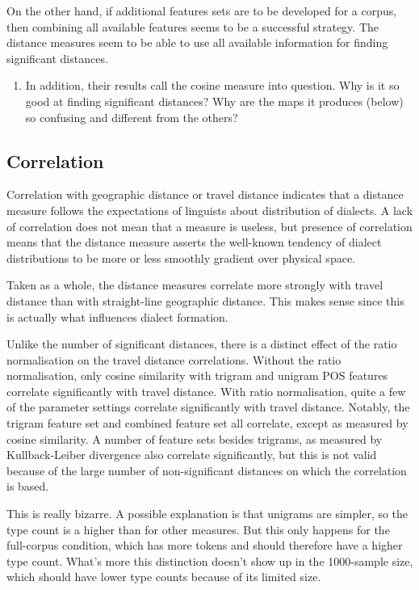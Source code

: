 On the other hand, if additional features sets are to be developed for
a corpus, then combining all available features seems to be a
successful strategy. The distance measures seem to be able to use all
available information for finding significant distances.

\begin{enumerate}
\item In addition, their results call the cosine measure into question. Why is it so
  good at finding significant distances? Why are the maps it produces (below) so
  confusing and different from the others?
\end{enumerate}
\subsection{Correlation}

Correlation with geographic distance or travel distance indicates that
a distance measure follows the expectations of linguists about
distribution of dialects. A lack of correlation does not mean that a
measure is useless, but presence of correlation means that the
distance measure asserts the well-known tendency of dialect
distributions to be more or less smoothly gradient over physical
space.

Taken as a whole, the distance measures correlate more strongly with
travel distance than with straight-line geographic distance. This
makes sense since this is actually what influences dialect formation.

Unlike the number of significant distances, there is a distinct effect
of the ratio normalisation on the travel distance
correlations. Without the ratio normalisation, only cosine similarity
with trigram and unigram POS features correlate significantly with
travel distance. With ratio normalisation, quite a few of the
parameter settings correlate significantly with travel
distance. Notably, the trigram feature set and combined feature set
all correlate, except as measured by cosine similarity. A number of
feature sets besides trigrams, as measured by Kullback-Leiber
divergence also correlate significantly, but this is not valid because
of the large number of non-significant distances on which the
correlation is based.

This is really bizarre. A possible explanation is that unigrams are
simpler, so the type count is a higher than for other
measures. But this only happens for the full-corpus condition, which
has more tokens and should therefore have a higher type count. What's
more this distinction doesn't show up in the 1000-sample size, which
should have lower type counts because of its limited size.

